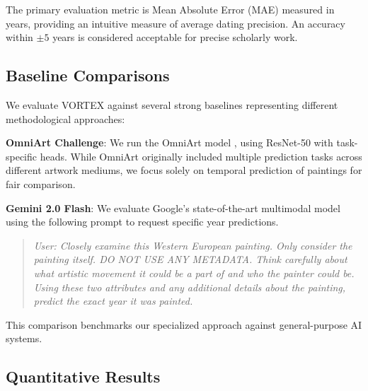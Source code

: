 \documentclass[10pt,twocolumn,letterpaper]{article}
\begin{document}
The primary evaluation metric is Mean Absolute Error (MAE) measured in years, providing an intuitive measure of average dating precision. An accuracy within $\pm5$ years is considered acceptable for precise scholarly work.

\subsection{Baseline Comparisons}

We evaluate VORTEX against several strong baselines representing different methodological approaches:

\textbf{OmniArt Challenge}: We run the OmniArt model \cite{Strezoski18}, using ResNet-50 with task-specific heads. While OmniArt originally included multiple prediction tasks across different artwork mediums, we focus solely on temporal prediction of paintings for fair comparison.

\textbf{Gemini 2.0 Flash}: We evaluate Google's state-of-the-art multimodal model \cite{GeminiTeam23} using the following prompt to request specific year predictions. 
\begin{quote}
    \textit{User: Closely examine this Western European painting. Only consider the painting itself. DO NOT USE ANY METADATA. Think carefully about what artistic movement it could be a part of and who the painter could be. Using these two attributes and any additional details about the painting, predict the exact year it was painted.}
\end{quote}
This comparison benchmarks our specialized approach against general-purpose AI systems.


\subsection{Quantitative Results}



\end{document}
